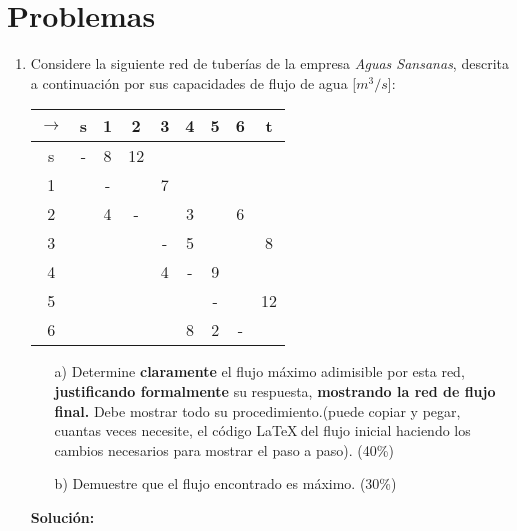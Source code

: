 \documentclass[letterpaper,10pt]{article}
\begin{document}
\section{Problemas}
\begin{enumerate}

    \item Considere la siguiente red de tuberías de la empresa \textit{Aguas Sansanas\texttrademark}, descrita a continuación por sus capacidades de flujo de agua [$m^3/s$]:
    
    \begin{center}
        \begin{tabular}{|c|c|c|c|c|c|c|c|c|}
        \hline
        $\rightarrow$& s & 1 & 2 & 3 & 4 & 5 & 6 & t\\
        \hline
        s& - & 8 & 12 &  &  &  &  & \\
        \hline
        1&  & - &  & 7 &  &  &  & \\
        \hline
        2&  & 4 & - &  & 3 &  & 6 & \\
        \hline
        3&  &  &  & - & 5 &  &  & 8\\
        \hline
        4&  &  &  & 4 & - & 9 &  & \\
        \hline
        5&  &  &  &  &  & - &  & 12\\
        \hline
        6&  &  &  &  & 8 & 2 & - & \\

        \hline

    \end{tabular}
    
    \end{center}
    
    \begin{enumerate}
        \item[a)] Determine \textbf{claramente} el flujo máximo adimisible por esta red, \textbf{justificando formalmente} su respuesta, \textbf{mostrando la red de flujo final.} Debe mostrar todo su procedimiento.(puede copiar y pegar, cuantas veces necesite, el código \LaTeX $~$del flujo inicial haciendo los cambios necesarios para mostrar el paso a paso). (40\%)
        \item[b)] Demuestre que el flujo encontrado es máximo.  (30\%)
    \end{enumerate}
    
    \textbf{Solución:}
    \vspace{1cm}
    
    

\end{enumerate}
\end{document}

